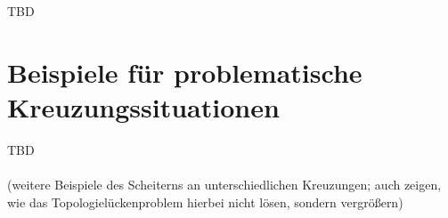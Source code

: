 \documentclass[../main/thesis.tex]{subfiles}
\begin{document}
TBD



\setcounter{chapter}{5}
\chapter{Beispiele für problematische Kreuzungssituationen}
\label{appx:junction-examples}

TBD\\
\\
(weitere Beispiele des Scheiterns an unterschiedlichen Kreuzungen; auch zeigen, wie  das Topologielückenproblem hierbei nicht lösen, sondern vergrößern)





\end{document}
